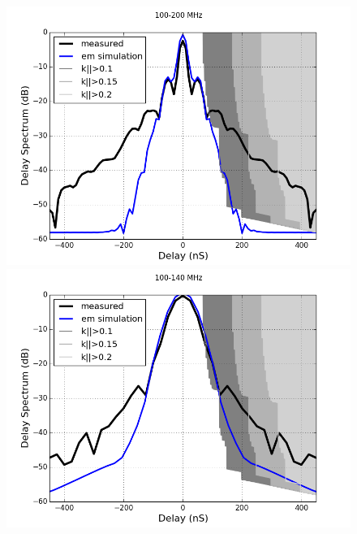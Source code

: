 \documentclass[twocolumn]{emulateapj}
\begin{document}
    \begin{figure}[ht]
    \begin{minipage}[b]{0.5\linewidth}
    \centering
    \includegraphics[angle=0, width=\linewidth]{GB_reflectometry_part3/plot/100_200.png}
    \end{minipage}
    \hspace{0.1cm}
    \begin{minipage}[b]{0.5\linewidth}
    \centering
    \includegraphics[angle=0, width=\linewidth]{GB_reflectometry_part3/plot/100_140.png}
    \end{minipage}
    \vspace{0.1cm}
    \begin{minipage}[b]{0.5\linewidth}

\end{minipage}
\end{figure}
\end{document}
